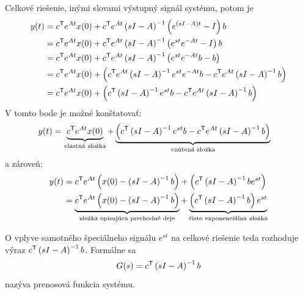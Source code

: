 \documentclass[a4paper, 10pt, ]{article}
\begin{document}
Celkové riešenie, inými slovami výstupný signál systému, potom je
\begin{align}
	\begin{aligned}
		y(t) &= c^{\mathsf{T}} e^{At} x(0) + c^{\mathsf{T}} e^{At} \left( sI - A \right)^{-1}  \left( e^{(sI-A)t} - I \right) b \\
		&= c^{\mathsf{T}} e^{At} x(0) + c^{\mathsf{T}} e^{At} \left( sI - A \right)^{-1}  \left( e^{st} e^{-At} - I \right) b \\
		&= c^{\mathsf{T}} e^{At} x(0) + c^{\mathsf{T}} e^{At} \left( sI - A \right)^{-1}  \left( e^{st} e^{-At}b - b \right) \\
		&= c^{\mathsf{T}} e^{At} x(0) +   \left(c^{\mathsf{T}} e^{At} \left( sI - A \right)^{-1} e^{st} e^{-At}b - c^{\mathsf{T}} e^{At} \left( sI - A \right)^{-1} b \right) \\
		&= c^{\mathsf{T}} e^{At} x(0) +   \left(c^{\mathsf{T}} \left( sI - A \right)^{-1} e^{st} b - c^{\mathsf{T}} e^{At} \left( sI - A \right)^{-1} b \right)
	\end{aligned}
\end{align}
V tomto bode je možné konštatovať:
\begin{align}
	\begin{aligned}
		y(t)
		&=
		\underbrace{
		c^{\mathsf{T}} e^{At} x(0)
		}_{\text{vlastná zložka}}
		+
		\underbrace{
		\left(c^{\mathsf{T}} \left( sI - A \right)^{-1} e^{st} b - c^{\mathsf{T}} e^{At} \left( sI - A \right)^{-1} b \right)
		}_{\text{vnútená zložka}}
	\end{aligned}
\end{align}
a zároveň:
\begin{align}
    \begin{split}
        y(t) 
        &= 
        c^{\mathsf{T}} e^{At} \left( x(0) -  \left( sI - A \right)^{-1} b\right) +   \left(c^{\mathsf{T}}  \left( sI - A \right)^{-1}  b e^{st} \right) 
        \\
        &=
        \underbrace{
        c^{\mathsf{T}} e^{At} \left( x(0) -  \left( sI - A \right)^{-1} b\right)
        }_{\text{zložka opisujúca prechodné deje}}
        +
        \underbrace{
        \left(c^{\mathsf{T}}  \left( sI - A \right)^{-1}  b  \right) e^{st}
        }_{\text{čisto exponenciálna zložka}}
    \end{split}
\end{align}

O vplyve samotného špeciálneho signálu $e^{st}$ na celkové riešenie teda rozhoduje výraz $c^{\mathsf{T}}  \left( sI - A \right)^{-1}  b$. Formálne sa
\begin{equation}
	G(s) = c^{\mathsf{T}}  \left( sI - A \right)^{-1}  b
\end{equation}
nazýva prenosová funkcia systému.
\end{document}
